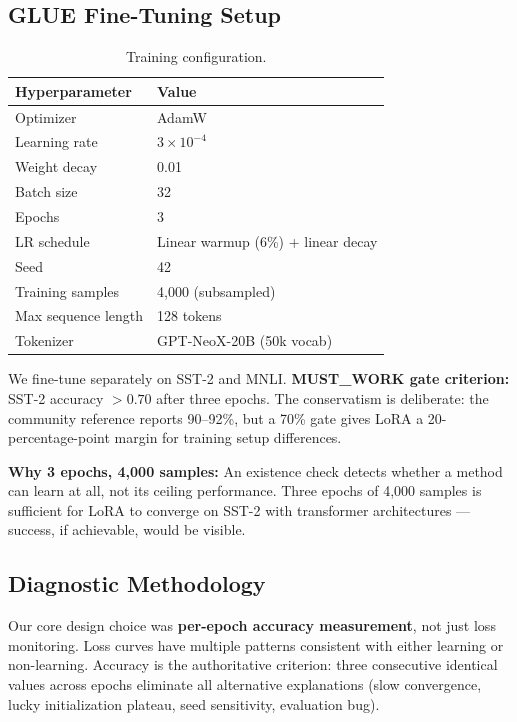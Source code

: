 \subsection{GLUE Fine-Tuning Setup}

\begin{table}[h]
\centering
\caption{Training configuration.}
\label{tab:training_config}
\begin{tabular}{@{}ll@{}}
\toprule
\textbf{Hyperparameter} & \textbf{Value} \\
\midrule
Optimizer & AdamW \\
Learning rate & $3 \times 10^{-4}$ \\
Weight decay & 0.01 \\
Batch size & 32 \\
Epochs & 3 \\
LR schedule & Linear warmup (6\%) + linear decay \\
Seed & 42 \\
Training samples & 4,000 (subsampled) \\
Max sequence length & 128 tokens \\
Tokenizer & GPT-NeoX-20B (50k vocab) \\
\bottomrule
\end{tabular}
\end{table}

We fine-tune separately on SST-2 and MNLI. \textbf{MUST\_WORK gate criterion:} SST-2 accuracy $> 0.70$ after three epochs. The conservatism is deliberate: the community reference reports 90--92\%, but a 70\% gate gives LoRA a 20-percentage-point margin for training setup differences.

\textbf{Why 3 epochs, 4,000 samples:} An existence check detects whether a method can learn at all, not its ceiling performance. Three epochs of 4,000 samples is sufficient for LoRA to converge on SST-2 with transformer architectures --- success, if achievable, would be visible.

\subsection{Diagnostic Methodology}

Our core design choice was \textbf{per-epoch accuracy measurement}, not just loss monitoring. Loss curves have multiple patterns consistent with either learning or non-learning. Accuracy is the authoritative criterion: three consecutive identical values across epochs eliminate all alternative explanations (slow convergence, lucky initialization plateau, seed sensitivity, evaluation bug).

